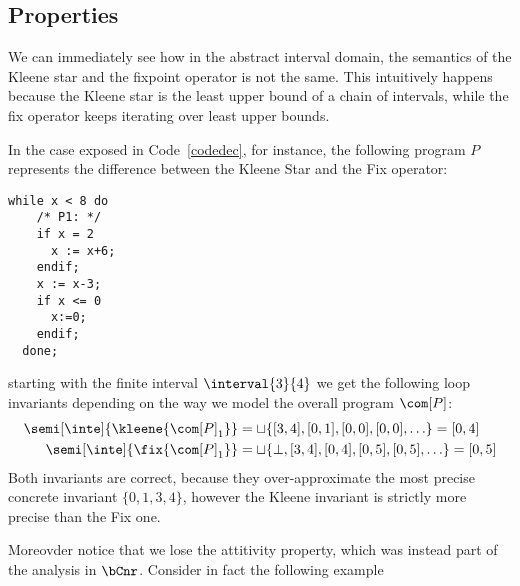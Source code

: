 \subsection{Properties}\label{sub:intervalsprop}

We can immediately see how in the abstract interval domain, the
semantics of the Kleene star and the fixpoint operator is not the
same. This intuitively happens because the Kleene star is the least
upper bound of a chain of intervals, while the fix operator keeps
iterating over least upper bounds.

\begin{example}\label{ex:fix} In the case exposed in
  Code~\ref{codedec}, for instance, the following program \(P\)
  represents the difference between the Kleene Star and the Fix
  operator:
  \begin{lstlisting}[caption=Program P\, denoting \(\fix{\com}\) and \(\com^*\) difference, label=codedec, language=Imp]
  while x < 8 do
    /* P1: */
    if x = 2
      x := x+6;
    endif;
    x := x-3;
    if x <= 0
      x:=0;
    endif;
  done;
  \end{lstlisting}
  starting with the finite interval \(\interval{3}{4}\) we get the
  following loop invariants depending on the way we model the overall
  program \(\com[P]\):
  \begin{align*}
    \semi[\inte]{\kleene{{\com[P]}_1}} & = \sqcup\{[3,4], [0,1], [0,0], [0,0], \ldots\} = [0,4]\\
    \semi[\inte]{\fix{{\com[P]}_1}} & = \sqcup\{\bot, [3,4], [0,4], [0,5], [0,5],\ldots\} = [0,5]
  \end{align*}
  \noindent
  Both invariants are correct, because they over-approximate the most
  precise concrete invariant \(\{0,1,3,4\}\), however the Kleene
  invariant is strictly more precise than the Fix one.
\end{example}

Moreovder notice that we lose the attitivity property, which was
instead part of the analysis in \(\bCnr\). Consider in fact the
following example

